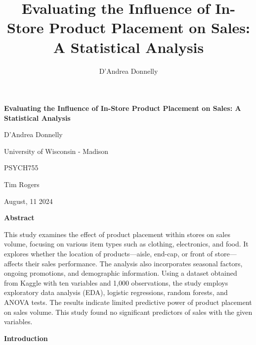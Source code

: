\documentclass[stu,12pt,floatsintext]{apa7}
\title{Evaluating the Influence of In-Store Product Placement on Sales: A Statistical Analysis}
\author{D'Andrea Donnelly}
\affiliation{University of Wisconsin - Madison}
\begin{document}

\hspace{0pt}
\vfill

\begin{center}
    \textbf{
    Evaluating the Influence of In-Store Product Placement on Sales: A Statistical Analysis
    }
\end{center} 
\begin{center}
    D'Andrea Donnelly
\end{center}
\begin{center}
    University of Wisconsin - Madison
\end{center}
\begin{center}
    PSYCH755
\end{center}
\begin{center}
    Tim Rogers
\end{center}
\begin{center}
    August, 11 2024 
\end{center}


\vfill
\hspace{0pt}
\pagebreak

\begin{center}
\textbf{\normalsize Abstract}
\end{center}

This study examines the effect of product placement within stores on sales volume, focusing on various item types such as clothing, electronics, and food. It explores whether the location of products—aisle, end-cap, or front of store—affects their sales performance. The analysis also incorporates seasonal factors, ongoing promotions, and demographic information. Using a dataset obtained from Kaggle with ten variables and 1,000 observations, the study employs exploratory data analysis (EDA), logistic regressions, random forests, and ANOVA tests. The results indicate limited predictive power of product placement on sales volume. This study found no significant predictors of sales with the given variables. 

\newpage

\begin{center}
\textbf{\normalsize Introduction}
\end{center}
 
\end{document}
